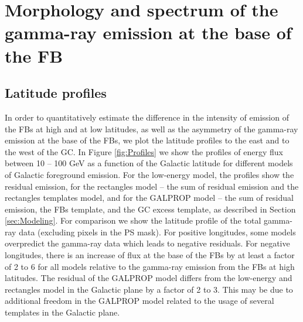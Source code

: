 \section{Morphology and spectrum of the gamma-ray emission at the base of the FB}


\subsection{Latitude profiles}
\label{sec:Latitude_profiles}

In order to quantitatively estimate the difference in the intensity of emission of the FBs at high and at low latitudes, as well as the asymmetry
of the gamma-ray emission at the base of the FBs,
we plot the latitude profiles to the east and to the west of the GC.
In Figure \ref{fig:Profiles} we show the profiles of energy flux between 10 -- 100 GeV as a function 
of the Galactic latitude for different models of Galactic foreground emission.
For the low-energy model, the profiles show the residual emission, 
for the rectangles model -- the sum of residual emission and the rectangles templates model, 
and for the GALPROP model --  the sum of residual emission, the FBs template, 
and the GC excess template, as described in Section \ref{sec:Modeling}. 
For comparison we show the latitude profile of the total gamma-ray data (excluding pixels in the PS mask).
For positive longitudes,
some models overpredict the gamma-ray data which leads to negative residuals.
For negative longitudes, there is an increase of flux at the base of the FBs 
by at least a factor of 2 to 6 for all models relative to the gamma-ray emission from the FBs at high latitudes. 
The residual of the GALPROP model differs from the low-energy and rectangles model in the Galactic plane by a factor of 2 to 3. 
This may be due to additional freedom in the GALPROP model related to the usage of several templates in the Galactic plane.



